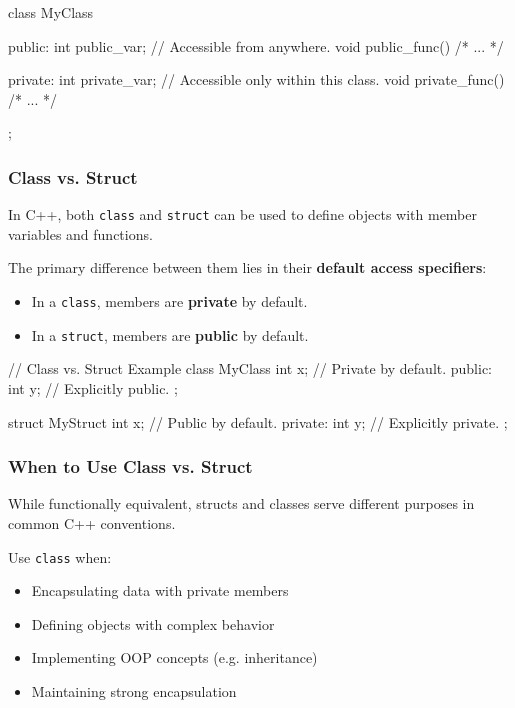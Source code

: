 \begin{codeblock}[language=C++, numbers=none]
class MyClass {
public:
    int public_var;      // Accessible from anywhere.
    void public_func() { /* ... */ }

private:
    int private_var;     // Accessible only within this class.
    void private_func() { /* ... */ }
};
\end{codeblock}

\subsubsection{Class vs. Struct}

In C++, both \texttt{class} and \texttt{struct} can be used to define objects with member variables and functions.

\vspace{0.5em}

The primary difference between them lies in their \textbf{default access specifiers}:

\begin{itemize}
    \item In a \texttt{class}, members are \textbf{private} by default.
    \item In a \texttt{struct}, members are \textbf{public} by default.
\end{itemize}

\begin{codeblock}[language=C++, numbers=none]
// Class vs. Struct Example
class MyClass {
    int x; // Private by default.
public:
    int y; // Explicitly public.
};

struct MyStruct {
    int x; // Public by default.
private:
    int y; // Explicitly private.
};
\end{codeblock}

\subsubsection{When to Use Class vs. Struct}

While functionally equivalent, structs and classes serve different purposes in common C++ conventions.

\vspace{0.5em}

Use \texttt{class} when:
\vspace{0.5em}
\begin{itemize}
    \item Encapsulating data with private members
    \item Defining objects with complex behavior
    \item Implementing OOP concepts (e.g. inheritance)
    \item Maintaining strong encapsulation
\end{itemize}

